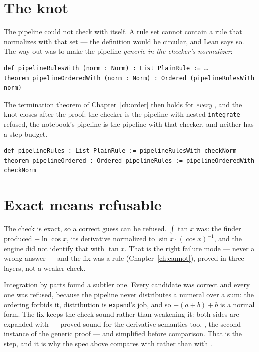 \section{The knot}

The pipeline could not check with itself. A rule set cannot contain a rule that normalizes with
that set --- the definition would be circular, and Lean says so. The way out was to make the
pipeline \emph{generic in the checker's normalizer}:

\begin{verbatim}
def pipelineRulesWith (norm : Norm) : List PlainRule := …
theorem pipelineOrderedWith (norm : Norm) : Ordered (pipelineRulesWith norm)
\end{verbatim}

The termination theorem of Chapter~\ref{ch:order} then holds for \emph{every} , and the
knot closes after the proof: the checker is the pipeline with nested \texttt{integrate} refused,
the notebook's pipeline is the pipeline with that checker, and neither has a step budget.

\begin{verbatim}
def pipelineRules : List PlainRule := pipelineRulesWith checkNorm
theorem pipelineOrdered : Ordered pipelineRules := pipelineOrderedWith checkNorm
\end{verbatim}

\section{Exact means refusable}

The check is exact, so a correct guess can be refused. $\int \tan x$ was: the finder produced
$-\ln \cos x$, its derivative normalized to $\sin x \cdot (\cos x)^{-1}$, and the engine did not
identify that with $\tan x$. That is the right failure mode --- never a wrong answer --- and the fix
was a rule (Chapter~\ref{ch:cannot}), proved in three layers, not a weaker check.

Integration by parts found a subtler one. Every candidate was correct and every one was refused,
because the pipeline never distributes a numeral over a sum: the ordering forbids it, distribution
is \texttt{expand}'s job, and so $-(a + b) + b$ is a normal form. The fix keeps the check sound
rather than weakening it: both sides are expanded with  --- proved sound for the
derivative semantics too, , the second instance of the generic proof --- and
simplified before comparison. That is the  step, and it is why the spec above
compares  with  rather than  with
.

